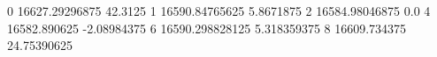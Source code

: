 0 16627.29296875 42.3125
1 16590.84765625 5.8671875
2 16584.98046875 0.0
4 16582.890625 -2.08984375
6 16590.298828125 5.318359375
8 16609.734375 24.75390625
